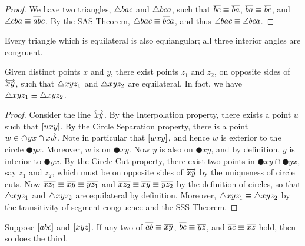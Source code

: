 \begin{proof}
We have two triangles, $\bigtriangleup{bac}$ and $\bigtriangleup{bca}$, such that $\overline{bc}\equiv \overline{ba}$, $\overline{ba} \equiv \overline{bc}$, and $\angle{cba} \equiv \overline{ab}{c}$. By the SAS Theorem, $\bigtriangleup{bac} \equiv \overline{bc}{a}$, and thus $\angle{bac} \equiv \angle{bca}$.
\end{proof}

\begin{cor}
Every triangle which is equilateral is also equiangular; all three interior angles are congruent.
\end{cor}

\begin{construct}
Given distinct points $x$ and $y$, there exist points $z_1$ and $z_2$, on opposite sides of $\overleftrightarrow{xy}$, such that $\bigtriangleup{xyz_1}$ and $\bigtriangleup{xyz_2}$ are equilateral. In fact, we have $\bigtriangleup{xyz_1} \equiv \bigtriangleup{xyz_2}$.
\end{construct}

\begin{proof}
Consider the line $\overleftrightarrow{xy}$. By the Interpolation property, there exists a point $u$ such that $[ u x y ]$. By the Circle Separation property, there is a point $w \in \ocircle{yx} \cap \overrightarrow{xw}$. Note in particular that $[ w x y ]$, and hence $w$ is exterior to the circle $\CIRCLE{y}{x}$. Moreover, $w$ is on $\CIRCLE{x}{y}$. Now $y$ is also on $\CIRCLE{x}{y}$, and by definition, $y$ is interior to $\CIRCLE{y}{x}$. By the Circle Cut property, there exist two points in $\CIRCLE{x}{y} \cap \CIRCLE{y}{x}$, say $z_1$ and $z_2$, which must be on opposite sides of $\overleftrightarrow{xy}$ by the uniqueness of circle cuts. Now $\overline{xz_1} \equiv \overline{xy} \equiv \overline{yz_1}$ and $\overline{xz_2} \equiv \overline{xy} \equiv \overline{yz_2}$ by the definition of circles, so that $\bigtriangleup{xyz_1}$ and $\bigtriangleup{xyz_2}$ are equilateral by definition. Moreover, $\bigtriangleup{xyz_1} \equiv \bigtriangleup{xyz_2}$ by the transitivity of segment congruence and the SSS Theorem.
\end{proof}

\begin{prop}
Suppose $[ a b c ]$ and $[ x y z ]$. If any two of $\overline{ab} \equiv \overline{xy}$, $\overline{bc} \equiv \overline{yz}$, and $\overline{ac} \equiv \overline{xz}$ hold, then so does the third.
\end{prop}

